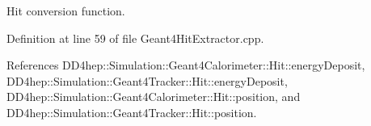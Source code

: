 Hit conversion function. 

Definition at line 59 of file Geant4HitExtractor.cpp.

References DD4hep::Simulation::Geant4Calorimeter::Hit::energyDeposit, DD4hep::Simulation::Geant4Tracker::Hit::energyDeposit, DD4hep::Simulation::Geant4Calorimeter::Hit::position, and DD4hep::Simulation::Geant4Tracker::Hit::position.